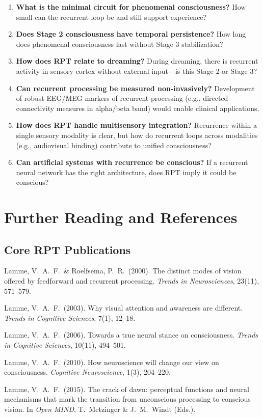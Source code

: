 \documentclass[11pt,a4paper]{report}
\begin{document}
\begin{enumerate}[leftmargin=2em]
  \item \textbf{What is the minimal circuit for phenomenal consciousness?} How small can the recurrent loop be and still support experience?
  \item \textbf{Does Stage 2 consciousness have temporal persistence?} How long does phenomenal consciousness last without Stage 3 stabilization?
  \item \textbf{How does RPT relate to dreaming?} During dreaming, there is recurrent activity in sensory cortex without external input---is this Stage 2 or Stage 3?
  \item \textbf{Can recurrent processing be measured non-invasively?} Development of robust EEG/MEG markers of recurrent processing (e.g., directed connectivity measures in alpha/beta band) would enable clinical applications.
  \item \textbf{How does RPT handle multisensory integration?} Recurrence within a single sensory modality is clear, but how do recurrent loops across modalities (e.g., audiovisual binding) contribute to unified consciousness?
  \item \textbf{Can artificial systems with recurrence be conscious?} If a recurrent neural network has the right architecture, does RPT imply it could be conscious?
\end{enumerate}


\chapter{Further Reading and References}

\section*{Core RPT Publications}
\begin{enumerate}[label={[\arabic*]}, leftmargin=2.5em]
  \item Lamme, V.\ A.\ F.\ \& Roelfsema, P.\ R.\ (2000). The distinct modes of vision offered by feedforward and recurrent processing. \textit{Trends in Neurosciences}, 23(11), 571--579.
  \item Lamme, V.\ A.\ F.\ (2003). Why visual attention and awareness are different. \textit{Trends in Cognitive Sciences}, 7(1), 12--18.
  \item Lamme, V.\ A.\ F.\ (2006). Towards a true neural stance on consciousness. \textit{Trends in Cognitive Sciences}, 10(11), 494--501.
  \item Lamme, V.\ A.\ F.\ (2010). How neuroscience will change our view on consciousness. \textit{Cognitive Neuroscience}, 1(3), 204--220.
  \item Lamme, V.\ A.\ F.\ (2015). The crack of dawn: perceptual functions and neural mechanisms that mark the transition from unconscious processing to conscious vision. In \textit{Open MIND}, T.\ Metzinger \& J.\ M.\ Windt (Eds.).
\end{enumerate}
\end{document}
